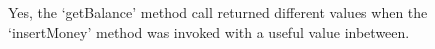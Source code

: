 Yes, the `getBalance' method call returned different values when the
`insertMoney' method was invoked with a useful value inbetween.

